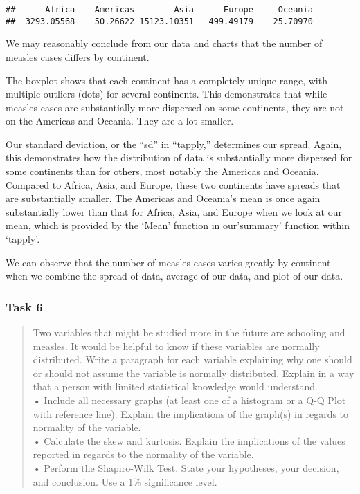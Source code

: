 \documentclass[
]{article}
\newenvironment{Shaded}{\begin{snugshade}}{\end{snugshade}}
\newcommand{\FunctionTok}[1]{\textcolor[rgb]{0.00,0.00,0.00}{#1}}
\newcommand{\NormalTok}[1]{#1}
\newcommand{\SpecialCharTok}[1]{\textcolor[rgb]{0.00,0.00,0.00}{#1}}
\begin{document}
\begin{Shaded}
\end{Shaded}

\begin{verbatim}
##      Africa    Americas        Asia      Europe     Oceania 
##  3293.05568    50.26622 15123.10351   499.49179    25.70970
\end{verbatim}

We may reasonably conclude from our data and charts that the number of
measles cases differs by continent.

The boxplot shows that each continent has a completely unique range,
with multiple outliers (dots) for several continents. This demonstrates
that while measles cases are substantially more dispersed on some
continents, they are not on the Americas and Oceania. They are a lot
smaller.

Our standard deviation, or the ``sd'' in ``tapply,'' determines our
spread. Again, this demonstrates how the distribution of data is
substantially more dispersed for some continents than for others, most
notably the Americas and Oceania. Compared to Africa, Asia, and Europe,
these two continents have spreads that are substantially smaller. The
Americas and Oceania's mean is once again substantially lower than that
for Africa, Asia, and Europe when we look at our mean, which is provided
by the `Mean' function in our'summary' function within `tapply'.

We can observe that the number of measles cases varies greatly by
continent when we combine the spread of data, average of our data, and
plot of our data.

\hypertarget{task-6}{%
\subsubsection{Task 6}\label{task-6}}

\begin{quote}
Two variables that might be studied more in the future are schooling and
measles. It would be helpful to know if these variables are normally
distributed. Write a paragraph for each variable explaining why one
should or should not assume the variable is normally distributed.
Explain in a way that a person with limited statistical knowledge would
understand.\\
• Include all necessary graphs (at least one of a histogram or a Q-Q
Plot with reference line). Explain the implications of the graph(s) in
regards to normality of the variable.\\
• Calculate the skew and kurtosis. Explain the implications of the
values reported in regards to the normality of the variable.\\
• Perform the Shapiro-Wilk Test. State your hypotheses, your decision,
and conclusion. Use a 1\% significance level.
\end{quote}
\end{document}
